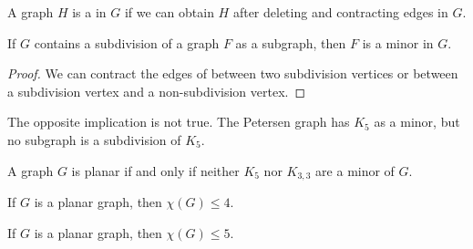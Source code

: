 \begin{definition}
  A graph $H$ is a  in $G$ if we can obtain $H$ after deleting and
  contracting edges in $G$.
\end{definition}

\begin{proposition}
  If $G$ contains a subdivision of a graph $F$ as a subgraph, then $F$ is a
  minor in $G$.
\end{proposition}

\begin{proof}
  We can contract the edges of between two subdivision vertices or between a
  subdivision vertex and a non-subdivision vertex.
\end{proof}

\begin{remark}
  The opposite implication is not true.
  The Petersen graph has $K_5$ as a minor, but no subgraph is a subdivision of
  $K_5$.
\end{remark}

\begin{theorem}[Wagner]
  A graph $G$ is planar if and only if neither $K_5$ nor $K_{3,3}$ are a minor
  of $G$.
\end{theorem}

\begin{theorem}
  If $G$ is a planar graph, then $\chi(G) \le 4$.
\end{theorem}

\begin{theorem}
  If $G$ is a planar graph, then $\chi(G) \le 5$.
\end{theorem}

